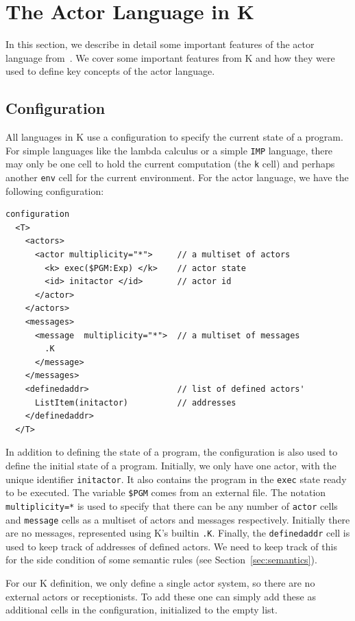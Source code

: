 \documentclass{llncs}
\begin{document}
\section{The Actor Language in K}
In this section, we describe in detail some important features of the actor
language from~\cite{actor}. We cover some important features from K and how 
they were
used to define key concepts of the actor language.

\subsection{Configuration}
All languages in K use a configuration to specify the current state of a
program. For simple languages like the lambda calculus or a simple \texttt{IMP}
language, there may only be one cell to hold the current computation (the
\texttt{k} cell) and perhaps another \texttt{env} cell for the current
environment. For the actor language, we have the following configuration:
\begin{verbatim}
configuration 
  <T>
    <actors>
      <actor multiplicity="*">     // a multiset of actors
        <k> exec($PGM:Exp) </k>    // actor state
        <id> initactor </id>       // actor id
      </actor>
    </actors>
    <messages>
      <message  multiplicity="*">  // a multiset of messages
        .K
      </message>
    </messages>
    <definedaddr>                  // list of defined actors'
      ListItem(initactor)          // addresses
    </definedaddr>
  </T>
\end{verbatim}
In addition to defining the state of a program, the configuration is also used
to define the initial state of a program. Initially, we only have one actor,
with the unique identifier \texttt{initactor}. It also contains the program in
the \texttt{exec} state ready to be executed. The variable \texttt{\$PGM} comes
from an external file. The notation \texttt{multiplicity=*} is used to specify
that there can be any number of \texttt{actor} cells and \texttt{message} cells
as a multiset of actors and messages respectively. Initially there are no
messages, represented using K's builtin \texttt{.K}. Finally, the
\texttt{definedaddr} cell is used to keep track of addresses of defined
actors. We need to keep track of this for the side condition of some semantic
rules (see Section~\ref{sec:semantics}).

For our K definition, we only define a single actor system, so there are no
external actors or receptionists. To add these one can simply add these as
additional cells in the configuration, initialized to the empty list.
\end{document}
